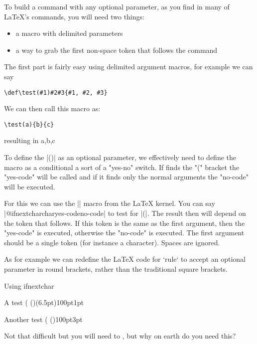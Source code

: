 To build a command with any optional parameter, as you find in many of LaTeX's commands, you will need two things:

\begin{itemize}
\item a macro with delimited parameters

\item a way to grab the first non-space token that follows the command
\end{itemize}


The first part is fairly easy using delimited argument macros, for example we can say

\begin{verbatim}
\def\test(#1)#2#3{#1, #2, #3}
\end{verbatim}

We can then call this macro as:

\begin{verbatim}
\test(a){b}{c}
\end{verbatim}


resulting in a,b,c

To define the |()| as an optional parameter, we effectively need to define the macro as a conditional a sort of a "yes-no" switch. If \tex finds the "(" bracket the "yes-code" will be called and if it finds only the normal arguments the "no-code" will be executed.

For this we can use the |\@ifnextchar| macro from the LaTeX kernel.
You can say |@ifnextchar{char}{yes-code}{no-code}| to test for |(|. The result then will depend on the token that follows. If this token is the same as the first argument, then the "yes-code" is executed, otherwise the "no-code" is executed. The first argument should be a single token (for instance a character). Spaces are ignored. 

As for example we can redefine the LaTeX code for `rule` to accept an optional parameter in round brackets, rather than the traditional square brackets.

\begin{texexample}{Using ifnextchar}{}
\makeatletter
\def\Rule{\@ifnextchar(\@Rule%
        {\@Rule(\z@)}}
\def\@Rule(#1)#2#3{%
 \leavevmode
 \hbox{%
 \setlength\@tempdima{#1}%
 \setlength\@tempdimb{#2}%
 \setlength\@tempdimc{#3}%
 \advance\@tempdimc\@tempdima
 \vrule\@width\@tempdimb\@height\@tempdimc\@depth-\@tempdima}}
\makeatother

A test \Rule(6.5pt){100pt}{1pt}

Another test \Rule{100pt}{3pt}

Not that difficult but you will need to , but why on earth do you need this?
\end{texexample}




